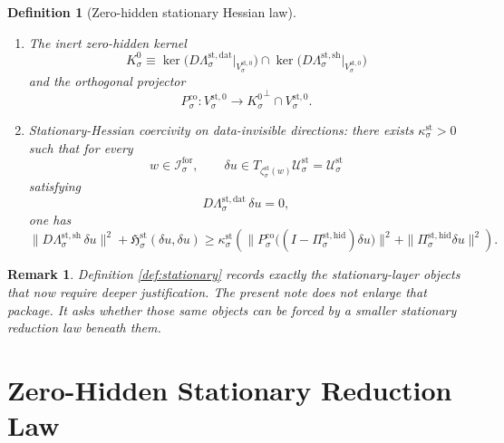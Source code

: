 \documentclass[11pt]{article}
\newcommand{\ForSpace}[1]{\mathcal I_{#1}^{\mathrm{for}}}
\newcommand{\Kernel}[1]{K_{#1}^{0}}
\newcommand{\StateComp}[1]{P_{#1}^{\mathrm{co}}}
\newcommand{\StatSpace}[1]{\mathcal U_{#1}^{\mathrm{st}}}
\newcommand{\StatBody}[1]{\mathcal B_{#1}^{\mathrm{st}}}
\newcommand{\StatData}[1]{\Lambda_{#1}^{\mathrm{st,dat}}}
\newcommand{\StatShell}[1]{\Lambda_{#1}^{\mathrm{st,sh}}}
\newcommand{\StatZero}[1]{V_{#1}^{\mathrm{st},0}}
\newcommand{\StatProj}[1]{\Pi_{#1}^{\mathrm{st,hid}}}
\newcommand{\StatHess}[1]{\mathfrak H_{#1}^{\mathrm{st}}}
\newcommand{\StatEmbed}[1]{\zeta_{#1}^{\mathrm{st}}}
\newtheorem{definition}{Definition}
\newtheorem{remark}{Remark}
\begin{document}
\begin{definition}[Zero-hidden stationary Hessian law]
\begin{enumerate}
\begin{equation}
    \StatBody{\sigma}\cap\StatZero{\sigma}
    \bigr)
    =
    \StatData{\sigma}\Bigl(
    \StatBody{\sigma}\cap
    \StatZero{\sigma}\cap
    \bigl(\StatShell{\sigma}\bigr)^{-1}(0)
    \Bigr).
    \label{eq:statsolvability}
    \end{equation}
    \item The inert zero-hidden kernel
    \[
    \Kernel{\sigma}
    \equiv
    \ker\bigl(D\StatData{\sigma}\big|_{\StatZero{\sigma}}\bigr)
    \cap
    \ker\bigl(D\StatShell{\sigma}\big|_{\StatZero{\sigma}}\bigr)
    \]
    and the orthogonal projector
    \[
    \StateComp{\sigma}:
    \StatZero{\sigma}\to
    {\Kernel{\sigma}}^{\perp}\cap\StatZero{\sigma}.
    \]
    \item Stationary-Hessian coercivity on data-invisible directions: there exists \(\kappa_{\sigma}^{\mathrm{st}}>0\) such that for every
    \[
    w\in\ForSpace{\sigma},
    \qquad
    \delta u\in T_{\StatEmbed{\sigma}(w)}\StatSpace{\sigma}=\StatSpace{\sigma}
    \]
    satisfying
    \[
    D\StatData{\sigma}\,\delta u=0,
    \]
    one has
    \begin{equation}
    \|D\StatShell{\sigma}\,\delta u\|^{2}
    +
    \StatHess{\sigma}(\delta u,\delta u)
    \ge
    \kappa_{\sigma}^{\mathrm{st}}
    \left(
    \|\StateComp{\sigma}\bigl((I-\StatProj{\sigma})\delta u\bigr)\|^{2}
    +
    \|\StatProj{\sigma}\delta u\|^{2}
    \right).
    \label{eq:statcoercive}
    \end{equation}
\end{enumerate}
\end{definition}

\begin{remark}
Definition \ref{def:stationary} records exactly the stationary-layer objects that now require deeper justification. The present note does not enlarge that package. It asks whether those same objects can be forced by a smaller stationary reduction law beneath them.
\end{remark}

\section{Zero-Hidden Stationary Reduction Law}
\end{document}
